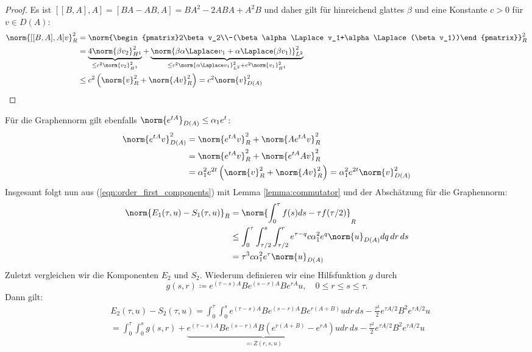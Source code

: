 \begin{proof}
Es ist $[[B,A],A]=[BA-AB,A]=BA^2-2ABA+A^2B$ und daher gilt für hinreichend glattes $\beta$ und eine Konstante $c>0$ für $v\in D(A)$:
\begin{align*}
\norm{[[B,A],A]v}_R^2&=\norm{\begin{pmatrix}2\beta v_2\\-(\beta\alpha\Laplace v_1+\alpha\Laplace(\beta v_1))\end{pmatrix}}_R^2\\
&=\underbrace{4\norm{\beta v_2}_{H^1}^2}_{\le c^2\norm{v_2}_{H^1}^2}+\underbrace{\norm{\beta\alpha\Laplace v_1 + \alpha\Laplace(\beta v_1)}_{L^2}^2}_{\le c^2\norm{\alpha \Laplace v_1}_{L^2}^2+c^2\norm{v_1}_{H^1}^2}\\
&\le c^2 \left(\norm{v}_R^2+\norm{Av}_R^2\right)=c^2\norm{v}_{D(A)}^2
\end{align*}
\end{proof}
Für die Graphennorm gilt ebenfalls $\norm{e^{tA}}_{D(A)}\le \alpha_1e^t$:
\begin{align*}
\norm{e^{tA}v}_{D(A)}^2&=\norm{e^{tA}v}_R^2+\norm{Ae^{tA}v}_R^2\\
&=\norm{e^{tA}v}_R^2+\norm{e^{tA}Av}_R^2\\
&=\alpha_1^2e^{2t}\left(\norm{v}_R^2+\norm{Av}_R^2\right)=\alpha_1^2e^{2t}\norm{v}_{D(A)}^2
\end{align*}
Insgesamt folgt nun aus (\ref{eqn:order_first_components}) mit Lemma \ref{lemma:commutator} und der Abschätzung für die Graphennorm:
\begin{align*}
\norm{E_1(\tau,u)-S_1(\tau,u)}_R&=\norm{\int_0^\tau f(s)ds-\tau f(\tau/2)}_R\\
&\le \int_0^\tau\int_{\tau/2}^s\int_{\tau/2}^r e^{\tau - q}c\alpha_1^2e^q\norm{u}_{D(A)}dq\,dr\,ds\\
&=\tau^3c\alpha_1^2e^\tau\norm{u}_{D(A)}
\end{align*}
Zuletzt vergleichen wir die Komponenten $E_2$ und $S_2$. Wiederum definieren wir eine Hilfsfunktion $g$ durch
\[g(s,r)\coloneqq e^{(\tau-s)A}Be^{(s-r)A}Be^{rA}u,\quad 0\le r\le s\le \tau.\]
Dann gilt:
\begin{align*}
&E_2(\tau,u)-S_2(\tau,u)=\int_0^\tau\int_0^se^{(\tau-s)A}Be^{(s-r)A}Be^{r(A+B)}udr\,ds-\frac{\tau^2}{2}e^{\tau A/2}B^2e^{\tau A/2}u\\
&=\int_0^\tau\int_0^s g(s,r) + \underbrace{e^{(\tau-s)A}Be^{(s-r)A}B\left(e^{r(A+B)}-e^{rA}\right)u}_{\eqqcolon Z(r,s,u)}dr\,ds-\frac{\tau^2}{2}e^{\tau A/2}B^2e^{\tau A/2}u
\end{align*}
